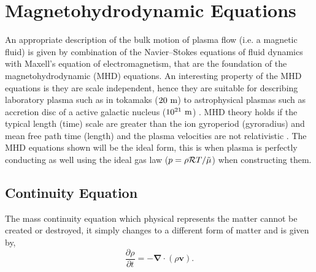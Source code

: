 \documentclass[12pt]{ociamthesis}
\newcommand{\bn}{\boldsymbol{\nabla}}
\newcommand{\rgas}{\mathcal{R}}
\begin{document}
\section{Magnetohydrodynamic Equations}
\label{section:MHD_eqs}
An appropriate description of the bulk motion of plasma flow (i.e. a magnetic fluid) is given by combination of the Navier–Stokes equations of fluid dynamics with Maxell's equation of electromagnetism, that are the foundation of the magnetohydrodynamic (MHD) equations. An interesting property of the MHD equations is they are scale independent, hence they are suitable for describing laboratory plasma such as in tokamaks ($20~\rm{m}$) to astrophysical plasmas such as accretion disc of a active galactic nucleus ($10^{21}~\rm{m}$) \citep{goedbloed2004principles}. MHD theory holds if the typical length (time) scale are greater than the ion gyroperiod (gyroradius) and mean free path time (length) and the plasma velocities are not relativistic \citep{priest2014magnetohydrodynamics}. The MHD equations shown will be the ideal form, this is when plasma is perfectly conducting as well using the ideal gas law ($p = \rho \rgas T/\Tilde{\mu}$) when constructing them.    
\subsection{Continuity Equation}
\label{section:cont_eq}
The mass continuity equation which physical represents the matter cannot be created or destroyed, it simply changes to a different form of matter and is given by,
\begin{equation}\label{eq86}
\frac{\partial \rho}{\partial t} = - \bn \cdot (\rho \boldsymbol{v}).
\end{equation}
\end{document}
